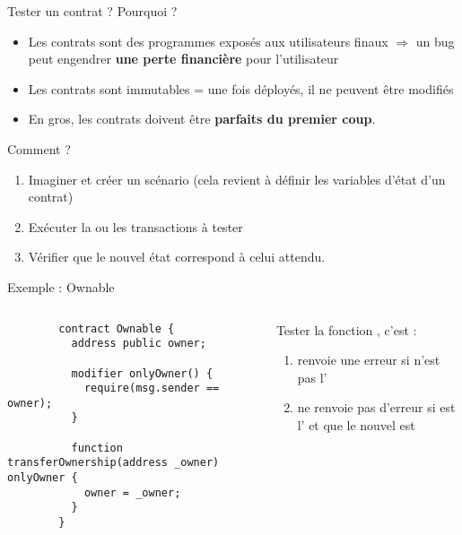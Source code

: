 
\begin{frame}{Tester un contrat ?}
  Pourquoi ?

  \begin{itemize}
    \item Les contrats sont des programmes exposés aux utilisateurs finaux $\Rightarrow$ un bug peut engendrer \textbf{une perte financière} pour l'utilisateur
    \item Les contrats sont immutables = une fois déployés, il ne peuvent être modifiés
    \item En gros, les contrats doivent être \textbf{parfaits du premier coup}.
  \end{itemize}

  Comment ?

  \begin{enumerate}
    \item Imaginer et créer un scénario (cela revient à définir les variables d'état d'un contrat)
    \item Exécuter la ou les transactions à tester
    \item Vérifier que le nouvel état correspond à celui attendu.
  \end{enumerate}
\end{frame}

\begin{frame}[fragile]{Exemple : Ownable}
  \begin{columns}
    \begin{column}{0.47\textwidth}
      \begin{verbatim}
        contract Ownable {
          address public owner;
    
          modifier onlyOwner() {
            require(msg.sender == owner);
          }
    
          function transferOwnership(address _owner) onlyOwner {
            owner = _owner;
          }
        }      
      \end{verbatim}
    \end{column}

    \begin{column}{0.47\textwidth}
      Tester la fonction , c'est :

      \begin{enumerate}
        \item {} renvoie une erreur si  n'est pas l'
        \item {} ne renvoie pas d'erreur si  est l' et que le nouvel  est 
      \end{enumerate}
    \end{column}
  \end{columns}
\end{frame}

